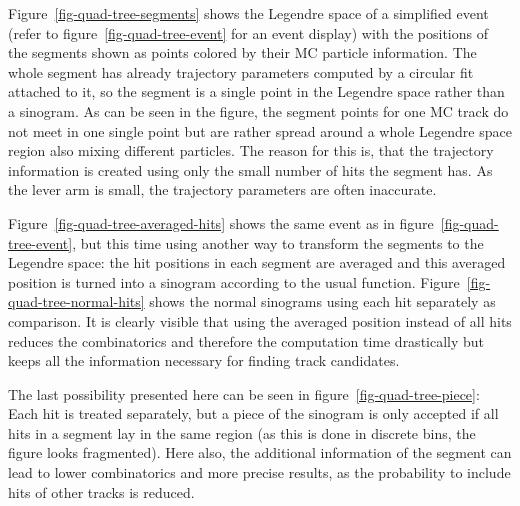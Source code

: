 Figure~\ref{fig-quad-tree-segments} shows the Legendre space of a simplified event (refer to figure~\ref{fig-quad-tree-event} for an event display) with the positions of the segments shown as points colored by their MC particle information. The whole segment has already trajectory parameters computed by a circular fit attached to it, so the segment is a single point in the Legendre space rather than a sinogram. As can be seen in the figure, the segment points for one MC track do not meet in one single point but are rather spread around a whole Legendre space region also mixing different particles. The reason for this is, that the trajectory information is created using only the small number of hits the segment has. As the lever arm is small, the trajectory parameters are often inaccurate. 

Figure~\ref{fig-quad-tree-averaged-hits} shows the same event as in figure~\ref{fig-quad-tree-event}, but this time using another way to transform the segments to the Legendre space: the hit positions in each segment are averaged and this averaged position is turned into a sinogram according to the usual function. Figure~\ref{fig-quad-tree-normal-hits} shows the normal sinograms using each hit separately as comparison. It is clearly visible that using the averaged position instead of all hits reduces the combinatorics and therefore the computation time drastically but keeps all the information necessary for finding track candidates.

The last possibility presented here can be seen in figure~\ref{fig-quad-tree-piece}: Each hit is treated separately, but a piece of the sinogram is only accepted if all hits in a segment lay in the same region (as this is done in discrete bins, the figure looks fragmented). Here also, the additional information of the segment can lead to lower combinatorics and more precise results, as the probability to include hits of other tracks is reduced.

